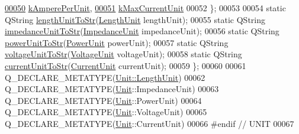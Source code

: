 \begin{DoxyCode}
\hypertarget{customtypes_8h_source_l00050}{}\hyperlink{class_unit_a0794cf6c9682f48296dd4a5315389787aeed3b50e464d581cb630181a3b6a0709}{00050}     \hyperlink{class_unit_a0794cf6c9682f48296dd4a5315389787aeed3b50e464d581cb630181a3b6a0709}{kAmperePerUnit},
\hypertarget{customtypes_8h_source_l00051}{}\hyperlink{class_unit_a0794cf6c9682f48296dd4a5315389787aeb1fd2a24bcda443e3c3d91c525134c8}{00051}     \hyperlink{class_unit_a0794cf6c9682f48296dd4a5315389787aeb1fd2a24bcda443e3c3d91c525134c8}{kMaxCurrentUnit}
00052   \};
00053 
00054   \textcolor{keyword}{static} QString \hyperlink{class_unit_abd363319f79f97b0a0b9a08c5ddc3cdb}{lengthUnitToStr}(\hyperlink{class_unit_a8c8921f7b225ad6063b1cb573425b9a0}{LengthUnit} lengthUnit);
00055   \textcolor{keyword}{static} QString \hyperlink{class_unit_ae3ca20f4b6530f04ca6aa138ec0fa7d2}{impedanceUnitToStr}(\hyperlink{class_unit_a3747e779c805df24a71961290be3fbdf}{ImpedanceUnit} impedanceUnit);
00056   \textcolor{keyword}{static} QString \hyperlink{class_unit_ad1487441b5a7eb93a3eb0aeebe947725}{powerUnitToStr}(\hyperlink{class_unit_ace265ae255370ccacfd5370337572c3b}{PowerUnit} powerUnit);
00057   \textcolor{keyword}{static} QString \hyperlink{class_unit_a7fa103c31f9f069961b35b6371ff0c0a}{voltageUnitToStr}(\hyperlink{class_unit_a55b07dfa9457e1eca2c7194fe0cfc3c1}{VoltageUnit} voltageUnit);
00058   \textcolor{keyword}{static} QString \hyperlink{class_unit_a7bd3ed3edcb18170cd162d384075b651}{currentUnitToStr}(\hyperlink{class_unit_a0794cf6c9682f48296dd4a5315389787}{CurrentUnit} currentUnit);
00059 \};
00060 
00061 Q\_DECLARE\_METATYPE(\hyperlink{class_unit_a8c8921f7b225ad6063b1cb573425b9a0}{Unit::LengthUnit})
00062 Q\_DECLARE\_METATYPE(\hyperlink{class_unit}{Unit}::ImpedanceUnit)
00063 Q\_DECLARE\_METATYPE(\hyperlink{class_unit}{Unit}::PowerUnit)
00064 Q\_DECLARE\_METATYPE(\hyperlink{class_unit}{Unit}::VoltageUnit)
00065 Q\_DECLARE\_METATYPE(\hyperlink{class_unit}{Unit}::CurrentUnit)
00066 \textcolor{preprocessor}{#endif // UNIT}
00067 
\end{DoxyCode}

